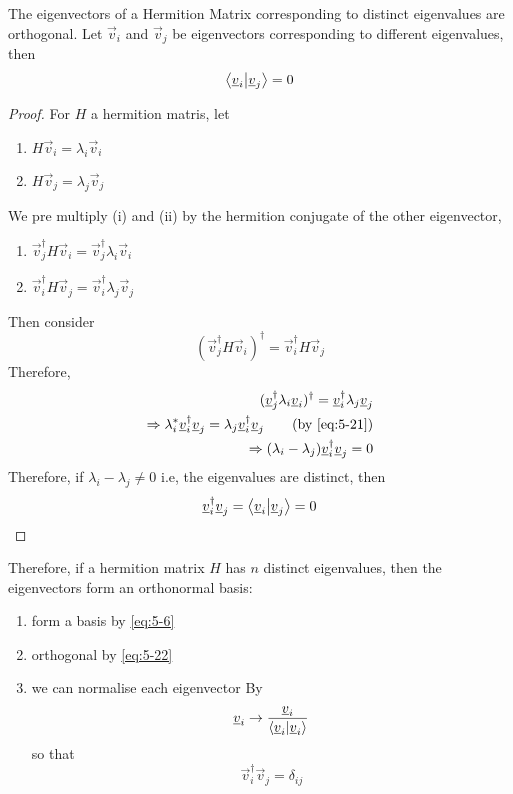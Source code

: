 \documentclass{article}
\numberwithin{equation}{section}
\begin{document}
\begin{thm}
    The eigenvectors of a Hermition Matrix corresponding to distinct eigenvalues are orthogonal.
    Let $\vec v_i$ and $\vec v_j$ be eigenvectors corresponding to different eigenvalues, then
    \begin{equation}\label{eq:5-22}
        \left\langle \underline{v}_i\middle\vert \underline{v}_j \right\rangle = 0
    \end{equation}
\end{thm}
\begin{proof}
    For $H$ a hermition matris, let
    \begin{enumerate}
        \item $H \vec v_i = \lambda_i \vec v_i$
        \item $H \vec v_j = \lambda_j \vec v_j$
    \end{enumerate}
    We pre multiply (i) and (ii) by the hermition conjugate of the other eigenvector,
    \begin{enumerate}
        \item $\vec v_j^\dagger H \vec v_i = \vec v_j^\dagger \lambda_i \vec v_i$
        \item $\vec v_i^\dagger H \vec v_j = \vec v_i^\dagger \lambda_j \vec v_j$
    \end{enumerate}
    Then consider
    \[
        (\vec v_j^\dagger H \vec v_i)^\dagger = \vec v_i^\dagger H \vec v_j
    \]
    Therefore,
    \begin{align*}
        (\vec v_j^\dagger \lambda_i \vec v_i)^\dagger = \vec v_i^\dagger \lambda_j \vec v_j \\
        \Rightarrow \lambda_i^* \vec v_i^\dagger\vec v_j = \lambda_j \vec v_i^\dagger\vec v_j \tag{by \eqref{eq:5-21}}\\
        \Rightarrow (\lambda_i - \lambda_j)\vec v_i^\dagger\vec v_j = 0
    \end{align*}
    Therefore, if $\lambda_i - \lambda_j \neq 0$ i.e, the eigenvalues are distinct, then
    \[
        \underline{v}_i^\dagger\underline{v}_j = \left\langle \underline{v}_i\middle\vert \underline{v}_j \right\rangle = 0
    \]
\end{proof}

Therefore, if a hermition matrix $H$ has $n$ distinct eigenvalues, then the eigenvectors form an orthonormal basis:
\begin{enumerate}
    \item form a basis by \eqref{eq:5-6}
    \item orthogonal by \eqref{eq:5-22}
    \item we can normalise each eigenvector By
    \[
        \underline{v}_i \rightarrow \frac{\underline{v}_i}{\left\langle \underline{v}_i\middle\vert \underline{v}_i \right\rangle}
    \]
    so that
    \[
        \vec v_i^\dagger\vec v_j = \delta_{ij}
    \]
\end{enumerate}
\end{document}
